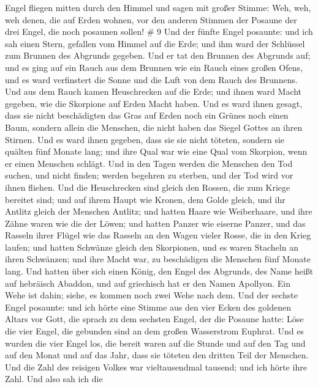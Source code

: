 Engel fliegen mitten durch den Himmel und sagen mit großer Stimme: Weh,
weh, weh denen, die auf Erden wohnen, vor den anderen Stimmen der
Posaune der drei Engel, die noch posaunen sollen! \# 9  Und
der fünfte Engel posaunte: und ich sah einen Stern, gefallen vom Himmel
auf die Erde; und ihm ward der Schlüssel zum Brunnen des Abgrunds
gegeben.  Und er tat den Brunnen des Abgrunds auf; und es
ging auf ein Rauch aus dem Brunnen wie ein Rauch eines großen Ofens, und
es ward verfinstert die Sonne und die Luft von dem Rauch des Brunnens.
 Und aus dem Rauch kamen Heuschrecken auf die Erde; und
ihnen ward Macht gegeben, wie die Skorpione auf Erden Macht haben.
 Und es ward ihnen gesagt, dass sie nicht beschädigten das
Gras auf Erden noch ein Grünes noch einen Baum, sondern allein die
Menschen, die nicht haben das Siegel Gottes an ihren Stirnen.
 Und es ward ihnen gegeben, dass sie sie nicht töteten,
sondern sie quälten fünf Monate lang; und ihre Qual war wie eine Qual
vom Skorpion, wenn er einen Menschen schlägt.  Und in den
Tagen werden die Menschen den Tod suchen, und nicht finden; werden
begehren zu sterben, und der Tod wird vor ihnen fliehen. 
Und die Heuschrecken sind gleich den Rossen, die zum Kriege bereitet
sind; und auf ihrem Haupt wie Kronen, dem Golde gleich, und ihr Antlitz
gleich der Menschen Antlitz;  und hatten Haare wie
Weiberhaare, und ihre Zähne waren wie die der Löwen;  und
hatten Panzer wie eiserne Panzer, und das Rasseln ihrer Flügel wie das
Rasseln an den Wagen vieler Rosse, die in den Krieg laufen;
 und hatten Schwänze gleich den Skorpionen, und es waren
Stacheln an ihren Schwänzen; und ihre Macht war, zu beschädigen die
Menschen fünf Monate lang.  Und hatten über sich einen
König, den Engel des Abgrunds, des Name heißt auf hebräisch Abaddon, und
auf griechisch hat er den Namen Apollyon.  Ein Wehe ist
dahin; siehe, es kommen noch zwei Wehe nach dem.  Und der
sechste Engel posaunte: und ich hörte eine Stimme aus den vier Ecken des
goldenen Altars vor Gott,  die sprach zu dem sechsten
Engel, der die Posaune hatte: Löse die vier Engel, die gebunden sind an
dem großen Wasserstrom Euphrat.  Und es wurden die vier
Engel los, die bereit waren auf die Stunde und auf den Tag und auf den
Monat und auf das Jahr, dass sie töteten den dritten Teil der Menschen.
 Und die Zahl des reisigen Volkes war vieltausendmal
tausend; und ich hörte ihre Zahl.  Und also sah ich die
